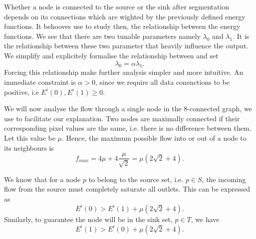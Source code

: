 \documentclass[10pt, journal, letterpaper, onecolumn, draftcls]{IEEEtran}
\begin{document}
Whether a node is connected to the source or the sink after segmentation depends on its connections which are wighted by the previously defined energy functions. It behooves use to study then, the relationship between the energy functions. We see that there are two tunable parameters namely $\lambda_0$ and $\lambda_1$. It is the relationship between these two parameter that heavily influence the output. We simplify and explicitely formalise the relationship between and set
\begin{equation}
	\lambda_0 = \alpha\lambda_1.
	\label{eq:l0l1dependancy}
\end{equation}
Forcing this relationship make further analysis simpler and more intuitive. An immediate constraint is $\alpha > 0$, since we require all data conenctions to be positive, i.e $E^i(0), E^i(1) \geq 0$.

We will now analyse the flow through a single node in the 8-connected graph, we use  to facilitate our explanation. Two nodes are maximally connected if their corresponding pixel values are the same, i.e. there is no difference between them. Let this value be $\mu$. Hence, the maximum possible flow into or out of a node to its neighbours is
\begin{equation}
	f_{max} = 4\mu + 4\frac{\mu}{\sqrt{2}} = \mu \left( 2\sqrt{2} + 4\right).
	\label{eq:neighbourhoodsaturation}
\end{equation}

We know that for a node $p$ to belong to the source set, i.e. $ p \in S$, the incoming flow from the source must completely saturate all outlets. This can be expressed as
\begin{equation}
	E^i(0) > E^i(1) + \mu \left( 2\sqrt{2} + 4\right).
	\label{eq:sourcesaturation}
\end{equation}
Similarly, to guarantee the node will be in the sink set, $p \in T$, we have
\begin{equation}
	E^i(1) > E^i(0) + \mu \left( 2\sqrt{2} + 4\right).
	\label{eq:sinksaturation}
\end{equation}
\end{document}
